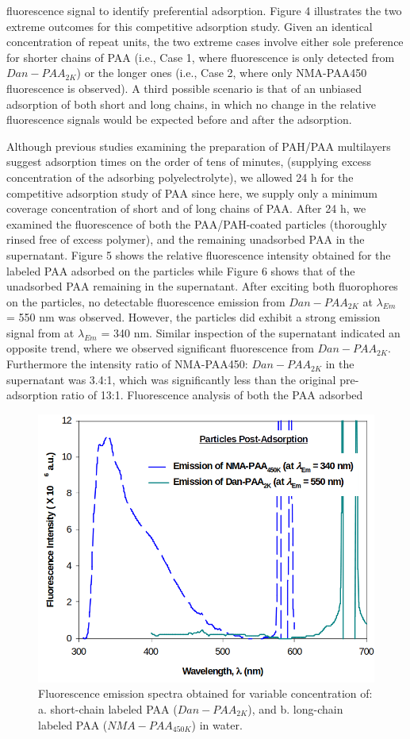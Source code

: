 \documentclass[journal=mamobx,manuscript=article]{achemso}
\begin{document}
fluorescence signal to identify preferential adsorption. Figure 4 illustrates the two extreme outcomes for this competitive adsorption study.  Given an identical concentration of repeat units, the two extreme cases involve either sole preference for shorter chains of PAA (i.e., Case 1, where fluorescence is only detected from $Dan-PAA_{2K}$) or the longer ones (i.e., Case 2, where only NMA-PAA450 fluorescence is observed).  A third possible scenario is that of an unbiased adsorption of both short and long chains, in which no change in the relative fluorescence signals would be expected before and after the adsorption. 

Although previous studies examining the preparation of PAH/PAA multilayers suggest adsorption times on the order of tens of minutes, (supplying excess concentration of the adsorbing polyelectrolyte), we allowed 24 h for the competitive adsorption study of PAA since here, we supply only a minimum coverage concentration of short and of long chains of PAA.  After 24 h, we examined the fluorescence of both the PAA/PAH-coated particles (thoroughly rinsed free of excess polymer), and the remaining unadsorbed PAA in the supernatant.  Figure 5 shows the relative fluorescence intensity obtained for the labeled PAA adsorbed on the particles while Figure 6 shows that of the unadsorbed PAA remaining in the supernatant.  After exciting both fluorophores on the particles, no detectable fluorescence emission from $Dan-PAA_{2K}$ at $\lambda_{Em}$ = 550 nm was observed.  However, the particles did exhibit a strong emission signal from at $\lambda_{Em}$ = 340 nm.  Similar inspection of the supernatant indicated an opposite trend, where we observed significant fluorescence from $Dan-PAA_{2K}$.  Furthermore the intensity ratio of NMA-PAA450: $Dan-PAA_{2K}$ in the supernatant was 3.4:1, which was significantly less than the original pre-adsorption ratio of 13:1.  Fluorescence analysis of both the PAA adsorbed 


\begin{figure}[H]
\includegraphics[scale=1.75]{fig5.png}
\caption{Fluorescence emission spectra obtained for variable concentration of: a. short-chain labeled PAA ($Dan-PAA_{2K}$), and b. long-chain labeled PAA ($NMA-PAA_{450K}$) in water.}
\label{figure 5}
\end{figure}
\end{document}
